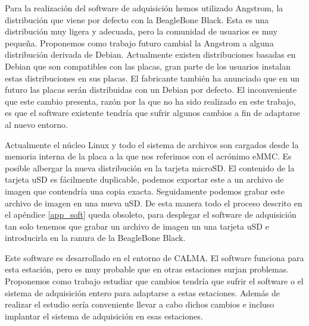 		\begin{description}[style=unboxed,leftmargin=0cm,labelwidth=1cm]
			\item[Debian]
				Para la realización del software de adquisición hemos utilizado Angstrom, la distribución que viene por defecto con la
				BeagleBone Black. Esta es una distribución muy ligera y adecuada, pero la comunidad de usuarios es muy pequeña.
				Proponemos como trabajo futuro cambial la Angstrom a alguna distribución derivada de Debian. Actualmente existen
				distribuciones basadas en Debian que son compatibles con las placas, gran parte de los usuarios instalan estas
				distribuciones en sus placas. El fabricante también ha anunciado que en un futuro las placas serán distribuidas con un
				Debian por defecto. El inconveniente que este cambio presenta, razón por la que no ha sido realizado en este trabajo,
				es que el software existente tendría que sufrir algunos cambios a fin de adaptarse al nuevo entorno.
				\par
				Actualmente el núcleo Linux y todo el sistema de archivos son cargados desde la memoria interna de la placa a la que
				nos referimos con el acrónimo eMMC. Es posible albergar la nueva distribución en la tarjeta microSD. El contenido de
				la tarjeta uSD es fácilmente duplicable, podemos exportar este a un archivo de imagen que contendría una copia exacta.
				Seguidamente podemos grabar este archivo de imagen en una nueva uSD. De esta manera todo el proceso descrito en el
				apéndice \ref{app_soft} queda obsoleto, para desplegar el software de adquisición  tan solo tenemos que grabar un
				archivo de imagen un una tarjeta uSD e introducirla en la ranura de la BeagleBone Black. 
			\item[Adaptación para otras estaciones]
				Este software es desarrollado en el entorno de CALMA. El software funciona para esta estación, pero es muy probable
				que en otras estaciones surjan problemas. Proponemos como trabajo estudiar que cambios tendría que sufrir el software
				o el sistema de adquisición entero para adaptarse a estas estaciones. Además de realizar el estudio sería conveniente
				llevar a cabo dichos cambios e incluso implantar el sistema de adquisición en esas estaciones.   
		\end{description}
